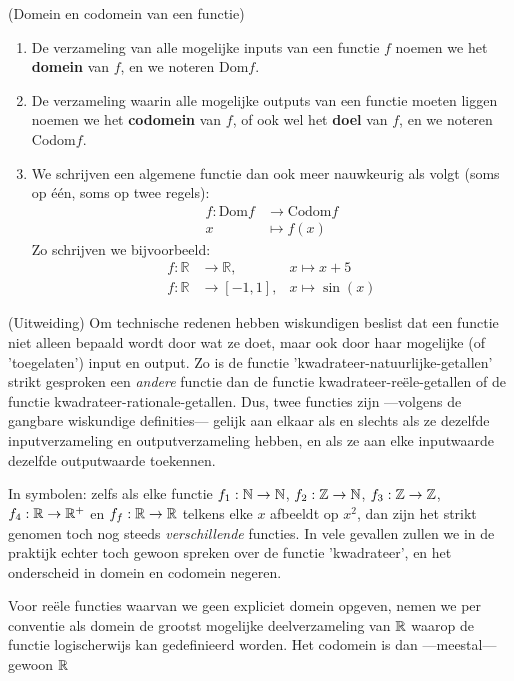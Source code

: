 \documentclass{ximera}
\begin{document}
 \begin{definition} (Domein en codomein van een functie)
	
	\begin{enumerate}
		\item De verzameling van alle mogelijke inputs van een functie $f$ noemen we het \textbf{domein} van $f$, en we noteren Dom$f$.
		\item De verzameling waarin alle mogelijke outputs van een functie moeten liggen noemen we het \textbf{codomein} van $f$, of ook wel het \textbf{doel} van $f$, en we noteren Codom$f$.
		\item We schrijven een algemene functie dan ook meer nauwkeurig als volgt (soms op één, soms op twee regels):
		\begin{align*}
		f: \text{Dom}f &\longrightarrow \text{Codom}f \\
		x &\longmapsto f(x)
		\end{align*}
		Zo schrijven we bijvoorbeeld:
		\begin{align*}
		f: \mathbb{R} &\longrightarrow \mathbb{R},         & x \longmapsto x+5  \\
		f: \mathbb{R} &\longrightarrow \left[-1,1\right],  & x \longmapsto \sin(x) 
		\end{align*}
	\end{enumerate}
\end{definition}

(Uitweiding) Om technische redenen hebben wiskundigen beslist dat een functie niet alleen bepaald wordt door wat ze doet, maar ook door haar mogelijke (of 'toegelaten') input en output. Zo is de functie 'kwadrateer-natuurlijke-getallen' strikt gesproken een \textit{andere} functie dan de functie kwadrateer-reële-getallen of de functie kwadrateer-rationale-getallen. Dus, twee functies zijn ---volgens de gangbare wiskundige definities--- gelijk aan elkaar als en slechts als ze dezelfde inputverzameling en outputverzameling hebben, en als ze aan elke inputwaarde dezelfde outputwaarde toekennen.

In symbolen: zelfs als elke functie
$f_1:\mathbb{N}\to\mathbb{N}$, $f_2:\mathbb{Z} \to\mathbb{N}$, $f_3:\mathbb{Z}\to\mathbb{Z}$, $f_4:\mathbb{R}\to\mathbb{R}^+$ en $f_f:\mathbb{R}\to\mathbb{R}$ telkens elke $x$ afbeeldt op $x^2$, dan zijn het strikt genomen toch nog steeds \textit{verschillende} functies. In vele gevallen zullen we in de praktijk echter toch gewoon spreken over de functie 'kwadrateer', en het onderscheid in domein en codomein negeren.

Voor reële functies waarvan we geen expliciet domein opgeven, nemen we per conventie als domein de grootst mogelijke deelverzameling van $\mathbb{R}$ waarop de functie logischerwijs kan gedefinieerd worden. Het codomein is dan ---meestal--- gewoon $\mathbb{R}$ 
\end{document}
